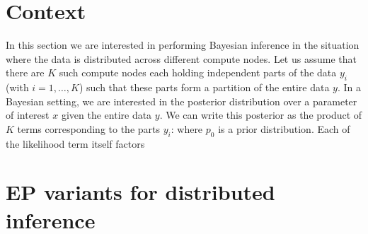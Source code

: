 

\section{Context}

In this section we are interested in performing Bayesian inference in the situation where the data is distributed across different compute nodes. 
Let us assume that there are $K$ such compute nodes each holding independent parts of the data $y_i$ (with $i=1,\dots,K$) such that these parts form a partition of the entire data $y$. 
In a Bayesian setting, we are interested in the posterior distribution over a parameter of interest $x$ given the entire data $y$. We can write this posterior as the product of $K$ terms corresponding to the parts $y_i$:
%
%
where $p_0$ is a prior distribution. Each of the likelihood term itself factors 

\section{EP variants for distributed inference}
\subsection{}
